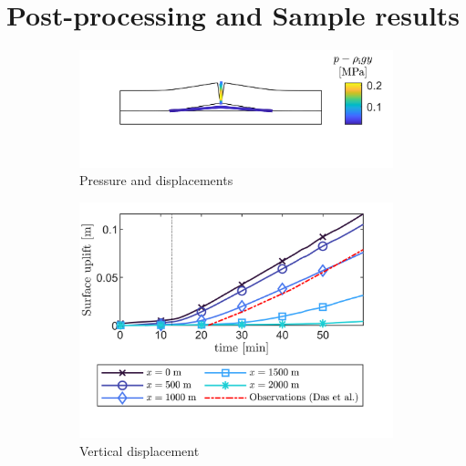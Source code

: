 \documentclass[3p]{elsarticle} %
\begin{document}
\section{Post-processing and Sample results}
\label{sec:postprocessing}
\begin{figure}
     \centering
     \begin{subfigure}[b]{8cm}
         \centering
         \includegraphics{../Figures/PSurf.png}
         \caption{Pressure and displacements}
         \label{fig:1}
     \end{subfigure}
     \begin{subfigure}[b]{8cm}
         \centering
         \includegraphics{../Figures/Uplift.png}
         \caption{Vertical displacement}
         \label{fig:2}
     \end{subfigure}
     \begin{subfigure}[b]{8cm}
         \centering

\end{subfigure}
\end{figure}
\end{document}

